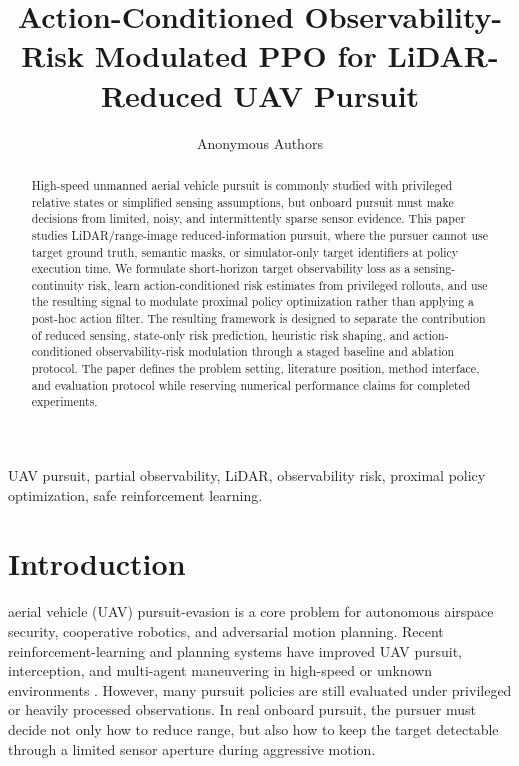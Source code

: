 \documentclass[lettersize,journal]{IEEEtran}
\begin{document}
\title{Action-Conditioned Observability-Risk Modulated PPO for LiDAR-Reduced UAV Pursuit}

\author{Anonymous Authors}


\maketitle

\begin{abstract}
  High-speed unmanned aerial vehicle pursuit is commonly studied with privileged relative states or simplified sensing assumptions, but onboard pursuit must make decisions from limited, noisy, and intermittently sparse sensor evidence. This paper studies LiDAR/range-image reduced-information pursuit, where the pursuer cannot use target ground truth, semantic masks, or simulator-only target identifiers at policy execution time. We formulate short-horizon target observability loss as a sensing-continuity risk, learn action-conditioned risk estimates from privileged rollouts, and use the resulting signal to modulate proximal policy optimization rather than applying a post-hoc action filter. The resulting framework is designed to separate the contribution of reduced sensing, state-only risk prediction, heuristic risk shaping, and action-conditioned observability-risk modulation through a staged baseline and ablation protocol. The paper defines the problem setting, literature position, method interface, and evaluation protocol while reserving numerical performance claims for completed experiments.
\end{abstract}

\begin{IEEEkeywords}
  UAV pursuit, partial observability, LiDAR, observability risk, proximal policy optimization, safe reinforcement learning.
\end{IEEEkeywords}

\section{Introduction}

 aerial vehicle (UAV) pursuit-evasion is a core problem for autonomous airspace security, cooperative robotics, and adversarial motion planning. Recent reinforcement-learning and planning systems have improved UAV pursuit, interception, and multi-agent maneuvering in high-speed or unknown environments \cite{yang2025rlpereview,chen2025open,zhang2023gameofdrones,yan2024lsrctd3,roncero2025agilecontrollers,giral2026intercept}. However, many pursuit policies are still evaluated under privileged or heavily processed observations. In real onboard pursuit, the pursuer must decide not only how to reduce range, but also how to keep the target detectable through a limited sensor aperture during aggressive motion.
\end{document}
